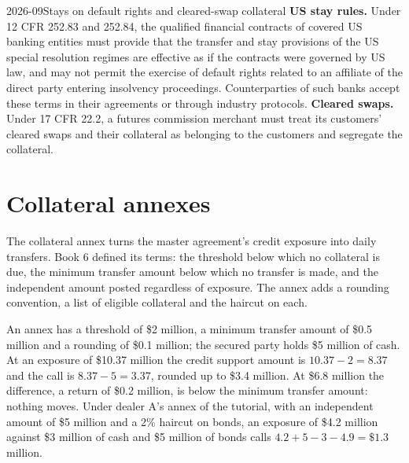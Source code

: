 \begin{dated}{2026-09}{Stays on default rights and cleared-swap collateral}\label{dat:fm:legal-documentation:stays}
\textbf{US stay rules.} Under 12 CFR 252.83 and 252.84, the qualified financial contracts of covered US banking entities must provide that the
transfer and stay provisions of the US special resolution regimes are effective as if the contracts were governed by US law, and may not permit the
exercise of default rights related to an affiliate of the direct party entering insolvency proceedings. Counterparties of such banks accept these
terms in their agreements or through industry protocols. \textbf{Cleared swaps.} Under 17 CFR 22.2, a futures commission merchant must treat its
customers' cleared swaps and their collateral as belonging to the customers and segregate the collateral.
\end{dated}

\section{Collateral annexes}

The collateral annex turns the master agreement's credit exposure into daily transfers. Book 6 defined its terms: the threshold below which no
collateral is due, the minimum transfer amount below which no transfer is made, and the independent amount posted regardless of exposure. The
annex adds a rounding convention, a list of eligible collateral and the haircut on each.

\begin{example}\label{ex:fm:legal-documentation:call}
An annex has a threshold of \$2 million, a minimum transfer amount of \$0.5 million and a rounding of \$0.1 million; the secured party holds \$5
million of cash. At an exposure of \$10.37 million the credit support amount is $10.37-2=8.37$ and the call is $8.37-5=3.37$, rounded up to \$3.4
million. At \$6.8 million the difference, a return of \$0.2 million, is below the minimum transfer amount: nothing moves. Under dealer A's annex of
the tutorial, with an independent amount of \$5 million and a 2\% haircut on bonds, an exposure of \$4.2 million against \$3 million of cash and \$5
million of bonds calls $4.2+5-3-4.9=\$1.3$ million.
\end{example}

\label{lst:fm:legal-documentation:annex}

